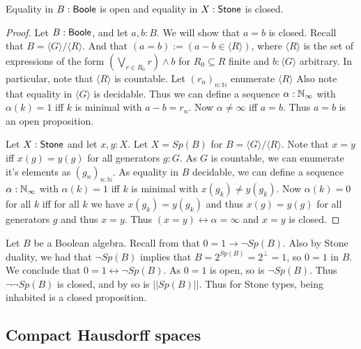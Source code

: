 \documentclass{../util/zariski-small}
\begin{document}
\begin{lemma}\label{EqualityBooleStoneClosedOpen}
  Equality in $B:\mathsf{Boole}$ is open and equality in $X:\mathsf{Stone}$ is closed. 
\end{lemma}
\begin{proof}
  Let $B:\mathsf{Boole}$, and let $a,b:B$. We will show that $a=b$ is closed. 
  Recall that $B = \langle G \rangle / \langle R \rangle$. 
  And that $(a=b):= (a-b \in \langle R \rangle)$, 
  where $\langle R \rangle$ is the set of expressions of the form
  $(\bigvee_{r\in R_0} r) \wedge b$ for $R_0\subseteq R$ finite and $b:\langle G \rangle$ 
  arbitrary. 
  In particular, note that $\langle R \rangle$ is countable. 
  Let $(r_n)_{n:\mathbb N}$ enumerate $ \langle R \rangle $
  Also note that equality in $\langle G \rangle$ is decidable. 
  Thus we can define a sequence $\alpha:\mathbb{N}_{\infty}$ with $\alpha(k) = 1$ 
  iff $k$ is minimal with $a -b = r_n$. 
  Now $\alpha \neq \infty $ iff $a = b$. Thus $a=b$ is an open proposition. 

  Let $X:\mathsf{Stone}$ and let $x,y:X$. 
  Let $X= Sp(B)$ for $B = \langle G \rangle / \langle R \rangle $. 
  Note that $x=y$ iff $x(g) = y(g)$ for all generators $g:G$. 
  As $G$ is countable, we can enumerate it's elements as $(g_n)_{n:\mathbb N}$. 
  As equality in $B$ decidable, we can define a sequence $\alpha:\mathbb{N}_{\infty}$ 
  with $\alpha(k) = 1$ iff $k$ is minimal with $x(g_k) \neq y(g_k)$. 
  Now $\alpha(k) = 0$ for all $k$ iff for all $k$ we have $x(g_k) = y(g_k)$ and thus $x(g) = y(g)$ for all generators $g$ 
  and thus $ x= y$. 
  Thus $(x=y) \leftrightarrow \alpha= \infty$ and $ x=y$ is closed. 
\end{proof}
\begin{corollary}\label{LemInhabitedOfStoneIsClosed}
  Let $B$ be a Boolean algebra.
  Recall from  that $0=1 \to \neg Sp(B)$. 
  Also by Stone duality, we had that $\neg Sp(B)$ implies that 
  $B = 2^{Sp(B)} = 2^\bot= 1$, so $0=1$ in $B$. 
  We conclude that $0=1 \leftrightarrow \neg Sp(B)$. 
  As $0=1$ is open, so is $\neg Sp(B)$. 
  Thus $\neg \neg Sp(B)$ is closed, and by  
  so is $||Sp(B)||$. 
  Thus for Stone types, being inhabited is a closed proposition. 
\end{corollary}



\subsection{Compact Hausdorff spaces}
\end{document}
